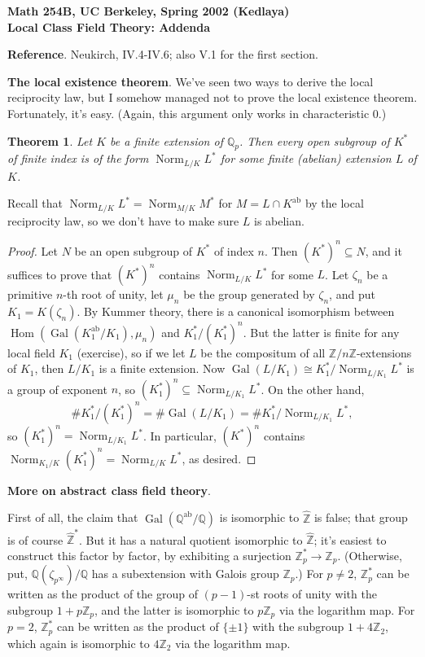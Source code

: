\documentclass[12pt]{article}
\def\QQ{\mathbb{Q}}
\def\ZZ{\mathbb{Z}}
\DeclareMathOperator{\ab}{ab}
\DeclareMathOperator{\Gal}{Gal}
\DeclareMathOperator{\Hom}{Hom}
\DeclareMathOperator{\Norm}{Norm}
\def\head#1{\medskip \noindent \textbf{#1}.}
\newtheorem{theorem}{Theorem}
\begin{document}
\begin{center}
\bf
Math 254B, UC Berkeley, Spring 2002 (Kedlaya) \\
Local Class Field Theory: Addenda
\end{center}

\head{Reference} Neukirch, IV.4-IV.6; also V.1 for the first section. 

\head{The local existence theorem}
We've seen two ways to derive the local reciprocity law, but I somehow
managed not to prove the local existence theorem. Fortunately, it's easy.
(Again, this argument only works in characteristic 0.)
\begin{theorem}
Let $K$ be a finite extension of $\QQ_p$. Then every open subgroup of $K^*$
of finite index is of the form $\Norm_{L/K} L^*$ for some finite (abelian)
extension $L$ of $K$.
\end{theorem}
Recall that $\Norm_{L/K} L^* = \Norm_{M/K} M^*$ for $M = L \cap K^{\ab}$
by the local reciprocity law, so we don't have to make sure $L$ is abelian.
\begin{proof}
Let $N$ be an open subgroup of $K^*$ of index $n$. Then $(K^*)^n \subseteq N$,
and it suffices to prove that $(K^*)^n$ contains $\Norm_{L/K} L^*$ for
some $L$. Let $\zeta_n$ be a primitive $n$-th root of unity, let $\mu_n$
be the group generated by $\zeta_n$, and put
$K_1 = K(\zeta_n)$. By Kummer theory, there is a canonical isomorphism
between $\Hom(\Gal(K_1^{\ab}/K_1), \mu_n)$ and $K_1^*/(K_1^*)^n$. But the latter
is finite for any local field $K_1$ (exercise), so if we let $L$ be the
compositum of all $\ZZ/n\ZZ$-extensions of $K_1$, then $L/K_1$ is a finite
extension. Now $\Gal(L/K_1) \cong K_1^*/\Norm_{L/K_1} L^*$ is a group of
exponent $n$, so $(K_1^*)^n \subseteq \Norm_{L/K_1} L^*$. On the other hand,
\[
\#K_1^*/(K_1^*)^n = \#\Gal(L/K_1) = \#K_1^*/\Norm_{L/K_1} L^*,
\]
so $(K_1^*)^n = \Norm_{L/K_1} L^*$. In particular, $(K^*)^n$ contains
$\Norm_{K_1/K} (K_1^*)^n = \Norm_{L/K} L^*$, as desired.
\end{proof}

\head{More on abstract class field theory}

First of all, the claim that $\Gal(\QQ^{\ab}/\QQ)$ is isomorphic to
$\widehat{\ZZ}$ is false; that group is of course $\widehat{\ZZ}^*$. But
it has a natural quotient isomorphic to $\widehat{\ZZ}$; it's easiest to
construct this factor by factor, by exhibiting a surjection $\ZZ_p^* \to
\ZZ_p$. (Otherwise, put,
$\QQ(\zeta_{p^\infty})/\QQ$ has a subextension with Galois group $\ZZ_p$.)
For $p \neq 2$, $\ZZ_p^*$ can be written as the product of the group of
$(p-1)$-st roots of unity with the subgroup $1+p\ZZ_p$, and the latter
is isomorphic to $p\ZZ_p$ via the logarithm map. For $p=2$,
$\ZZ_p^*$ can be written as the product of $\{\pm 1\}$ with the subgroup
$1+4\ZZ_2$, which again is isomorphic to $4\ZZ_2$ via the logarithm map.
\end{document}
